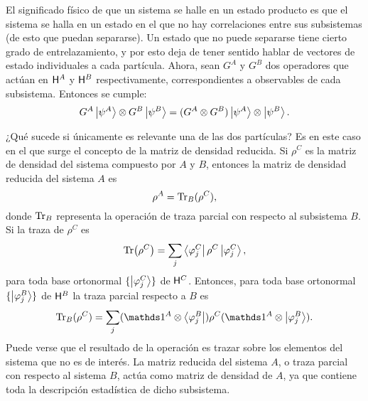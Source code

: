 El significado físico de que un sistema se halle en un estado producto es que el sistema se halla en un estado en el que no hay correlaciones entre sus subsistemas (de esto que puedan separarse). Un estado que no puede separarse tiene cierto grado de entrelazamiento, y por esto deja de tener sentido hablar de vectores de estado individuales a cada partícula. Ahora, sean $G^{A}$ y $G^{B}$ dos operadores que actúan en ${\sf H}^{A}$ y ${\sf H}^{B}$ respectivamente, correspondientes a observables de cada subsistema. Entonces se cumple:
\begin{equation}
    G^{A}\ket{\psi^{A}}\otimes G^{B}\ket{\psi^{B}}=(G^{A}\otimes G^{B})\ket{\psi^{A}}\otimes\ket{\psi^{B}}.\nonumber
\end{equation}

 ¿Qué sucede si únicamente es relevante una de las dos partículas? Es en este caso en el que surge el concepto de la matriz de densidad reducida. Si $\rho^{C}$ es la matriz de densidad del sistema compuesto por $A$ y $B$, entonces la matriz de densidad reducida del sistema $A$ es
\begin{equation}
    \rho^{A}=\Tr_{B}(\rho^{C}),\nonumber
\end{equation}
donde $\Tr_{B}$ representa la operación de traza parcial con respecto al subsistema $B$. Si la traza de $\rho^{C}$ es 
\begin{equation}
    \Tr(\rho^{C})=\sum_{j}\bra{\varphi^{C}_{j}}\rho^{C}\ket{\varphi^{C}_{j}},\nonumber
\end{equation}
para toda base ortonormal $\{\ket{\varphi^{C}_{j}}\}$ de ${\sf H}^{C}$. Entonces, para toda base ortonormal $\{\ket{\varphi^{B}_{j}}\}$ de ${\sf H}^{B}$  la traza parcial respecto a $B$ es \cite{Hardy}
\begin{equation}
    \Tr_{B}(\rho^{C})=\sum_{j}(\Id^{A}\otimes \bra{\varphi^{B}_{j}})\rho^{C}(\Id^{A}\otimes \ket{\varphi^{B}_{j}}).\nonumber
\end{equation}
Puede verse que el resultado de la operación es trazar sobre los elementos del sistema que no es de interés. La matriz reducida del sistema $A$, o traza parcial con respecto al sistema $B$, actúa como matriz de densidad de $A$, ya que contiene toda la descripción estadística de dicho subsistema.

